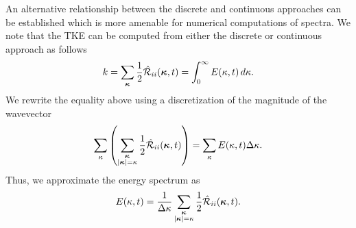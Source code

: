 \documentclass[oneside,a4paper,11pt]{report}
\newcommand{\tpvc}{\mathcal{R}} %
\newcommand{\est}{E}            %
\begin{document}
An alternative relationship between the discrete and continuous approaches can be established which is more amenable for numerical computations of spectra. We note that the TKE can be computed from either the discrete or continuous approach as follows
\begin{equation}
    k = \sum_{\kvec} \frac{1}{2} \hat{\tpvc}_{ii}(\kvec,t) = \int_0^\infty \est(\kappa,t) \, d\kappa.
\end{equation}
We rewrite the equality above using a discretization of the magnitude of the wavevector
\begin{equation}
    \sum_{\kappa} \left ( \sum_{\substack{\kvec \\ |\kvec|=\kappa}} \frac{1}{2} \hat{\tpvc}_{ii}(\kvec,t) \right) = \sum_{\kappa} \est(\kappa,t) \Delta \kappa.
\end{equation}
Thus, we approximate the energy spectrum as
\begin{equation}
    \label{eq:num_comp_spectra}
    E(\kappa,t) = \frac{1}{\Delta \kappa} \sum_{\substack{\kvec \\ |\kvec|=\kappa}} \frac{1}{2} \hat{\tpvc}_{ii}(\kvec,t) .
\end{equation}


\end{document}
